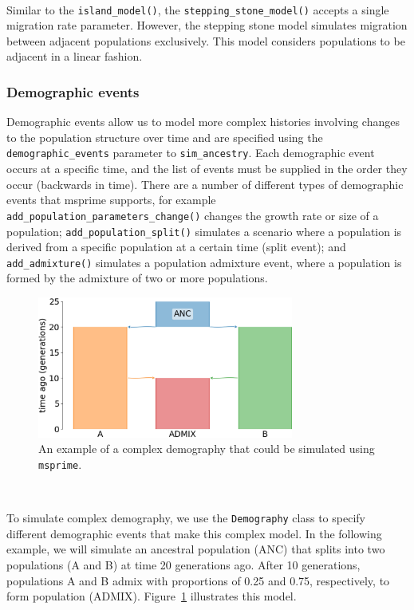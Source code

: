 \documentclass[graybox]{svmult}
\newcommand{\msprime}[0]{\texttt{msprime}}
\begin{document}
\label{stepping-stone-model} \

Similar to the \texttt{island\_model()}, the \texttt{stepping\_stone\_model()}
accepts a single migration rate parameter. However, the stepping stone model simulates
migration between adjacent populations exclusively. This model considers populations to be
adjacent in a linear fashion.

\subsubsection{Demographic events}\label{demographic-events}

Demographic events allow us to model more complex histories involving
changes to the population structure over time and are specified using
the \texttt{demographic\_events} parameter to \texttt{sim\_ancestry}. Each
demographic event occurs at a specific time, and the list of events must
be supplied in the order they occur (backwards in time). There are a
number of different types of demographic events that msprime supports, for example
\texttt{add\_population\_parameters\_change()} changes the growth rate or size of a population;
\texttt{add\_population\_split()} simulates a scenario where a population is derived from a
specific population at a certain time (split event);
and \texttt{add\_admixture()} simulates a population admixture event, where a population is
formed by the admixture of two or more populations.

\begin{figure}[t]
\centering
\includegraphics[width=0.75\textwidth]{images/admixture.pdf}
\caption{\label{fig:complex-demography} An example of a complex demography that could be
simulated using \msprime.}
\end{figure}

\label{Complex-demography} \

To simulate complex demography, we use the \texttt{Demography} class to specify different
demographic events that make this complex model. In the following example, we will
simulate an ancestral population (ANC) that splits into two populations (A and B) at time
20 generations ago. After 10 generations, populations A and B admix with proportions of 0.25
and 0.75, respectively, to form population (ADMIX). Figure~\ref{fig:complex-demography}
illustrates this model.
\end{document}
